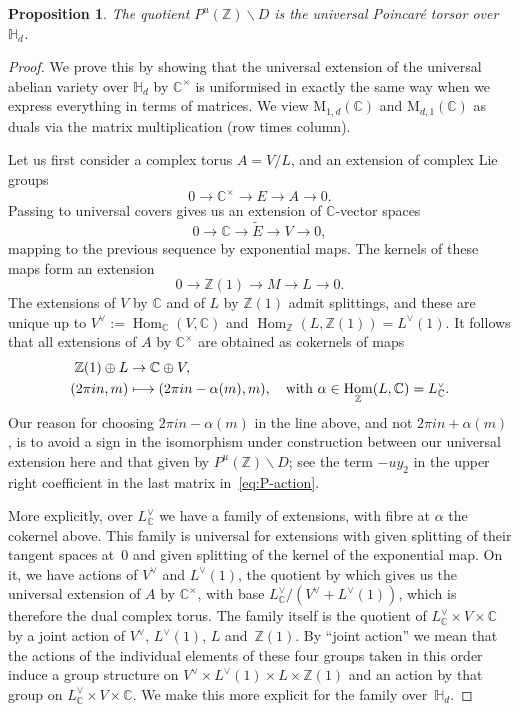 \documentclass[JEP,XML,SOM,Unicode,NoFloatCountersInSection]{cedram}
\def\mto{\mathchoice{\longmapsto}{\mapsto}{\mapsto}{\mapsto}}
\let\oldvee\vee
\renewcommand{\vee}{{\scriptscriptstyle\oldvee}}
\theoremstyle{plain}
\newtheorem{Proposition}[subsection]{Proposition}
\theoremstyle{definition}
\numberwithin{equation}{subsection}
\renewcommand{\C}{\mathbb C}
\newcommand{\Z}{\mathbb Z}
\renewcommand{\H}{\mathbb H}
\newcommand{\rmM}{\mathrm{M}}
\DeclareMathOperator{\Hom}{Hom}
\begin{document}
\begin{Proposition}\label{prop:MSV_and_PT}
The quotient $P^u(\Z)\backslash D$ is the universal Poincaré torsor over~$\H_d$.
\end{Proposition}
\begin{proof}
We prove this by showing that the universal extension of the
universal abelian variety over $\H_d$ by $\C^\times$ is uniformised
in exactly the same way when we express everything in terms of
matrices. We view $\rmM_{1,d}(\C)$ and $\rmM_{d,1}(\C)$ as duals via
the matrix multiplication (row times column).

Let us first consider a complex torus $A=V/L$, and an extension of
complex Lie groups
\[
0 \to \C^\times \to E \to A \to 0.
\]
Passing to universal covers gives us an extension of $\C$-vector
spaces
\[
0 \to \C \to \tilde{E} \to V \to 0,
\]
mapping to the previous sequence by exponential maps. The kernels of
these maps form an extension
\[
0 \to \Z(1) \to M \to L \to 0.
\]
The extensions of $V$ by $\C$ and of $L$ by $\Z(1)$ admit splittings,
and these are unique up to $V^\vee:=\Hom_\C(V,\C)$ and
$\Hom_\Z(L,\Z(1))=L^\vee(1)$. It follows that all extensions of $A$ by
$\C^\times$ are obtained as cokernels of maps
\begin{equation}\label{eq:cokernels}
\begin{aligned}
\Z(1)\oplus L & \to \C\oplus V,\\
(2\pi in,m)& \mto (2\pi i n - \alpha(m),m),\quad \text{with
$\alpha\in\Hom_\Z(L,\C)=L_\C^\vee$.}
\end{aligned}
\end{equation}
Our reason for choosing $2\pi i n-\alpha(m)$ in the line above, and
not $2\pi i n+\alpha(m)$, is to avoid a sign in the isomorphism under
construction between our universal extension here and that given by
$P^u(\Z)\backslash D$; see the term $-uy_2$ in the upper right
coefficient in the last matrix in~\eqref{eq:P-action}.

More explicitly, over $L_\C^\vee$ we have a family of extensions, with
fibre at $\alpha$ the cokernel above. This family is universal for
extensions with given splitting of their tangent spaces at~$0$ and
given splitting of the kernel of the exponential map. On it, we have
actions of $V^\vee$ and $L^\vee(1)$, the quotient by which gives us
the universal extension of $A$ by $\C^\times$, with base
$L_\C^\vee/(V^\vee+L^\vee(1))$, which is therefore the dual complex
torus. The family itself is the quotient of $L_\C^\vee\times
V\times\C$ by a joint action of $V^\vee$, $L^\vee(1)$, $L$
and~$\Z(1)$. By ``joint action'' we mean that the actions of the
individual elements of these four groups taken in this order induce a
group structure on $V^\vee\times L^\vee(1)\times L\times\Z(1)$ and an
action by that group on $L_\C^\vee\times V\times\C$. We make this more
explicit for the family over~$\H_d$.


\end{proof}
\end{document}
